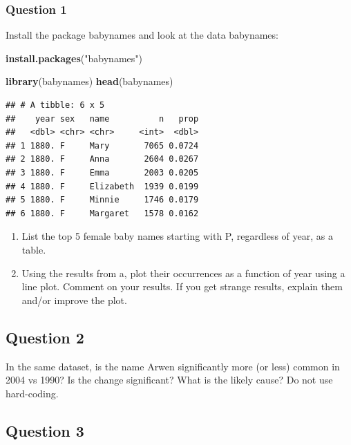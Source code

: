 \documentclass[]{article}
\newenvironment{Shaded}{\begin{snugshade}}{\end{snugshade}}
\newcommand{\KeywordTok}[1]{\textcolor[rgb]{0.13,0.29,0.53}{\textbf{#1}}}
\newcommand{\StringTok}[1]{\textcolor[rgb]{0.31,0.60,0.02}{#1}}
\newcommand{\NormalTok}[1]{#1}
\begin{document}
\subsubsection{Question 1}\label{question-1}

Install the package babynames and look at the data babynames:

\begin{Shaded}
\begin{Highlighting}[]
\KeywordTok{install.packages}\NormalTok{(}\StringTok{"babynames"}\NormalTok{)}
\end{Highlighting}
\end{Shaded}

\begin{Shaded}
\begin{Highlighting}[]
\KeywordTok{library}\NormalTok{(babynames)}
\KeywordTok{head}\NormalTok{(babynames)}
\end{Highlighting}
\end{Shaded}

\begin{verbatim}
## # A tibble: 6 x 5
##    year sex   name          n   prop
##   <dbl> <chr> <chr>     <int>  <dbl>
## 1 1880. F     Mary       7065 0.0724
## 2 1880. F     Anna       2604 0.0267
## 3 1880. F     Emma       2003 0.0205
## 4 1880. F     Elizabeth  1939 0.0199
## 5 1880. F     Minnie     1746 0.0179
## 6 1880. F     Margaret   1578 0.0162
\end{verbatim}

\begin{enumerate}
\def\labelenumi{\alph{enumi})}
\item
  List the top 5 female baby names starting with P, regardless of year,
  as a table.
\item
  Using the results from a, plot their occurrences as a function of year
  using a line plot. Comment on your results. If you get strange
  results, explain them and/or improve the plot.
\end{enumerate}

\subsection{Question 2}\label{question-2}

In the same dataset, is the name Arwen significantly more (or less)
common in 2004 vs 1990? Is the change significant? What is the likely
cause? Do not use hard-coding.

\subsection{Question 3}\label{question-3}
\end{document}

